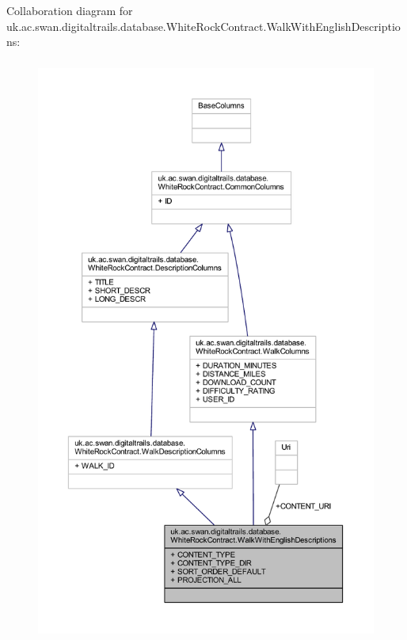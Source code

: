 Collaboration diagram for uk.\+ac.\+swan.\+digitaltrails.\+database.\+White\+Rock\+Contract.\+Walk\+With\+English\+Descriptions\+:
\nopagebreak
\begin{figure}[H]
\begin{center}
\leavevmode
\includegraphics[height=550pt]{classuk_1_1ac_1_1swan_1_1digitaltrails_1_1database_1_1_white_rock_contract_1_1_walk_with_english_descriptions__coll__graph}
\end{center}
\end{figure}
